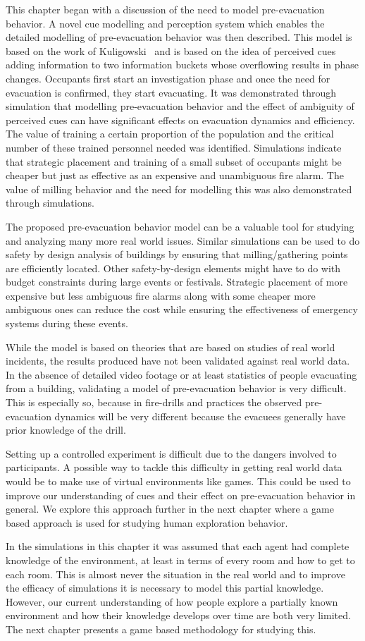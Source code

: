 This chapter began with a discussion of the need to model pre-evacuation behavior. A novel cue modelling and perception system which enables the detailed modelling of pre-evacuation behavior was then described. This model is based on the work of Kuligowski~\cite{Kuligowski:2009un} and is based on the idea of perceived cues adding information to two information buckets whose overflowing results in phase changes. Occupants first start an investigation phase and once the need for evacuation is confirmed, they start evacuating. It was demonstrated through simulation that modelling pre-evacuation behavior and the effect of ambiguity of perceived cues can have significant effects on evacuation dynamics and efficiency. The value of training a certain proportion of the population and the critical number of these trained personnel needed was identified. Simulations indicate that strategic placement and training of a small subset of occupants might be cheaper but just as effective as an expensive and unambiguous fire alarm. The value of milling behavior and the need for modelling this was also demonstrated through simulations.

The proposed pre-evacuation behavior model can be a valuable tool for studying and analyzing many more real world issues. Similar simulations can be used to do safety by design analysis of buildings by ensuring that milling/gathering points are efficiently located. Other safety-by-design elements might have to do with budget constraints during large events or festivals. Strategic placement of more expensive but less ambiguous fire alarms along with some cheaper more ambiguous ones can reduce the cost while ensuring the effectiveness of emergency systems during these events.

While the model is based on theories that are based on studies of real world incidents, the results produced have not been validated against real world data. In the absence of detailed video footage or at least statistics of people evacuating from a building, validating a model of pre-evacuation behavior is very difficult. This is especially so, because in fire-drills and practices the observed pre-evacuation dynamics will be very different because the evacuees generally have prior knowledge of the drill.

Setting up a controlled experiment is difficult due to the dangers involved to participants. A possible way to tackle this difficulty in getting real world data would be to make use of virtual environments like games. This could be used
to improve our understanding of cues and their effect on pre-evacuation behavior in general. We explore this approach further in the next chapter where a game based approach is used for studying human exploration behavior.


In the simulations in this chapter it was assumed that each agent had complete knowledge of the environment, at least in terms of every room and how to get to each room. This is almost never the situation in the real world and to improve the efficacy of simulations it is necessary to model this partial knowledge. However, our current understanding of how people explore a partially known environment and how their knowledge develops over time are both very limited. The next chapter presents a game based methodology for studying this.
